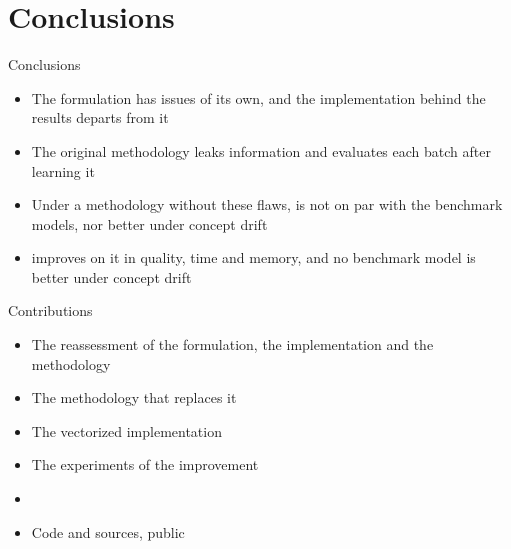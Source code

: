 \documentclass[aspectratio=169]{beamer}
\begin{document}
\section{Conclusions}

\begin{frame}{Conclusions}
  \begin{itemize}
    \item The formulation has issues of its own, and the implementation behind the results departs from it
    \item The original methodology leaks information and evaluates each batch after learning it
    \item Under a methodology without these flaws, \MicroTEDAClus is not on par with the benchmark models, nor better under concept drift
    \item \MicroTEDAClusPlus improves on it in quality, time and memory, and no benchmark model is better under concept drift
  \end{itemize}
\end{frame}

\begin{frame}{Contributions}
  \begin{itemize}
    \item The reassessment of the formulation, the implementation and the methodology
    \item The methodology that replaces it
    \item The vectorized implementation
    \item The experiments of the improvement
    \item \MicroTEDAClusPlus
    \item Code and sources, public~\cite{carvalho2026microtedaclusreassessment}
  \end{itemize}
\end{frame}
\end{document}

